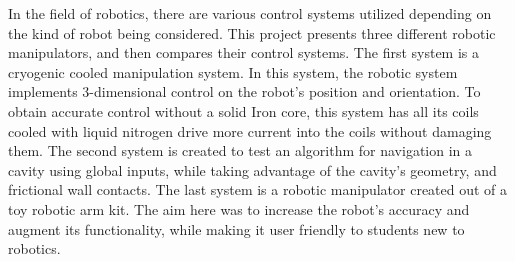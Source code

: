 


In the field of robotics, there are various control systems utilized depending on the kind of robot being considered. This project presents three different robotic manipulators, and then compares their control systems. The first system is a cryogenic cooled manipulation system. In this system, the robotic system implements 3-dimensional control on the robot’s position and orientation. To obtain accurate control without a solid Iron core, this system has all its coils cooled with liquid nitrogen drive more current into the coils without damaging them. The second system is created to test an algorithm for navigation in a cavity using global inputs, while taking advantage of the cavity’s geometry, and frictional wall contacts. The last system is a robotic manipulator created out of a toy robotic arm kit. The aim here was to increase the robot’s accuracy and augment its functionality, while making it user friendly to students new to robotics.